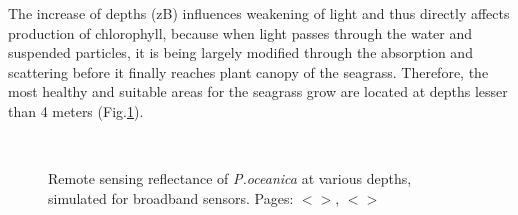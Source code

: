 \documentclass[11pt]{article}
\begin{document}
The increase of depths (zB) influences weakening of light and thus directly affects
production of chlorophyll, because when light passes through the water and suspended particles, it is
being largely modified through the absorption and scattering before it finally reaches plant canopy of
the seagrass. Therefore, the most healthy and suitable areas for the seagrass grow are located at depths
lesser than 4 meters (Fig.\ref{fig:4.9})\label{page-37}.

\begin{figure}[H]
	\centering
	\\
	\caption{Remote sensing reflectance of \textit{P.oceanica} at various depths, simulated for broadband sensors. Pages: $<$\pageref{page-37}$>$, $<$\pageref{page-32}$>$}
	\label{fig:4.9}
\end{figure}
\end{document}
